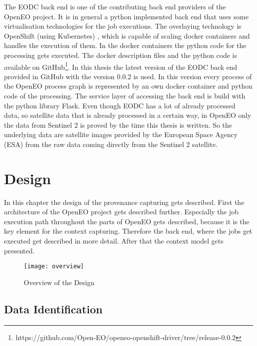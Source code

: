 \documentclass[draft,final]{vutinfth} %
\begin{document}
 The EODC back end is one of the contributing back end providers of the OpenEO project. It is in general a python implemented back end that uses some virtualisation technologies for the job executions. The overlaying technology is OpenShift (using Kubernetes) \cite{openshift}, which is capable of scaling docker containers and handles the execution of them. In the docker containers the python code for the processing gets executed. The docker description files and the python code is available on GitHub\footnote{https://github.com/Open-EO/openeo-openshift-driver/tree/release-0.0.2}. In this thesis the latest version of the EODC back end provided in GitHub with the version 0.0.2 is used. In this version every process of the OpenEO process graph is represented by an own docker container and python code of the processing. The service layer of accessing the back end is build with the python library Flask. Even though EODC has a lot of already processed data, so satellite data that is already processed in a certain way, in OpenEO only the data from Sentinel 2 is proved by the time this thesis is written. So the underlying data are satellite images provided by the European Space Agency (ESA) from the raw data coming directly from the Sentinel 2 satellite. 
\chapter{Design}\label{Design}
In this chapter the design of the provenance capturing gets described. First the architecture of the OpenEO project gets described further. Especially the job execution path throughout the parts of OpenEO gets described, because it is the key element for the context capturing. Therefore the back end, where the jobs get executed get described in more detail. After that the context model gets presented. 

\begin{figure}[h]
	\centering
	\texttt{[image: overview]}
	\caption{Overview of the Design}
	\label{fig:overview} %
\end{figure}

\section{Data Identification}\label{Design:Data Identification}
\end{document}
